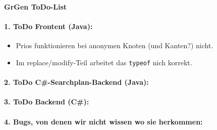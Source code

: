 \documentclass[12pt,a4paper]{article}
\begin{document}
\noindent
{\bf\Large GrGen ToDo-List}

\paragraph{1. ToDo Frontent (Java):}
\begin{itemize}
  \item Prios funktionieren bei anonymen Knoten (und Kanten?) nicht.
  \item Im replace/modify-Teil arbeitet das {\tt typeof} nich korrekt.
\end{itemize}
\vspace{0.5cm}

\paragraph{2. ToDo C\#-Searchplan-Backend (Java):}

\paragraph{3. ToDo Backend (C\#):}

\paragraph{4. Bugs, von denen wir nicht wissen wo sie herkommen:}
\end{document}
